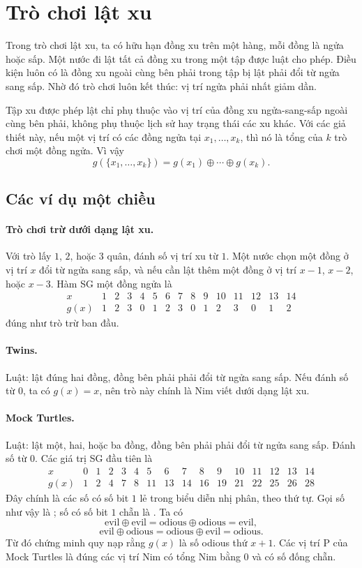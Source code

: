 \documentclass[11pt]{article}
\newcommand{\xor}{\mathbin{\oplus}}
\begin{document}
\section{Trò chơi lật xu}

Trong trò chơi lật xu, ta có hữu hạn đồng xu trên một hàng, mỗi đồng là ngửa
hoặc sấp. Một nước đi lật tất cả đồng xu trong một tập được luật cho phép.
Điều kiện luôn có là đồng xu ngoài cùng bên phải trong tập bị lật phải đổi từ
ngửa sang sấp. Nhờ đó trò chơi luôn kết thúc: vị trí ngửa phải nhất giảm dần.

Tập xu được phép lật chỉ phụ thuộc vào vị trí của đồng xu ngửa-sang-sấp ngoài
cùng bên phải, không phụ thuộc lịch sử hay trạng thái các xu khác. Với các giả
thiết này, nếu một vị trí có các đồng ngửa tại \(x_1,\ldots,x_k\), thì nó là
tổng của \(k\) trò chơi một đồng ngửa. Vì vậy
\[
  g(\{x_1,\ldots,x_k\})=g(x_1)\xor\cdots\xor g(x_k).
\]

\subsection{Các ví dụ một chiều}

\paragraph{Trò chơi trừ dưới dạng lật xu.}
Với trò lấy \(1\), \(2\), hoặc \(3\) quân, đánh số vị trí xu từ \(1\). Một
nước chọn một đồng ở vị trí \(x\) đổi từ ngửa sang sấp, và nếu cần lật thêm
một đồng ở vị trí \(x-1\), \(x-2\), hoặc \(x-3\). Hàm SG một đồng ngửa là
\[
\begin{array}{c|cccccccccccccc}
x&1&2&3&4&5&6&7&8&9&10&11&12&13&14\\ \hline
g(x)&1&2&3&0&1&2&3&0&1&2&3&0&1&2
\end{array}
\]
đúng như trò trừ ban đầu.

\paragraph{Twins.}
Luật: lật đúng hai đồng, đồng bên phải phải đổi từ ngửa sang sấp. Nếu đánh số
từ \(0\), ta có \(g(x)=x\), nên trò này chính là Nim viết dưới dạng lật xu.

\paragraph{Mock Turtles.}
Luật: lật một, hai, hoặc ba đồng, đồng bên phải phải đổi từ ngửa sang sấp.
Đánh số từ \(0\). Các giá trị SG đầu tiên là
\[
\begin{array}{c|ccccccccccccccc}
x&0&1&2&3&4&5&6&7&8&9&10&11&12&13&14\\ \hline
g(x)&1&2&4&7&8&11&13&14&16&19&21&22&25&26&28
\end{array}
\]
Đây chính là các số có số bit \(1\) lẻ trong biểu diễn nhị phân, theo thứ tự.
Gọi số như vậy là ; số có số bit \(1\) chẵn là . Ta có
\[
  \text{evil}\xor\text{evil}=\text{odious}\xor\text{odious}=\text{evil},
\]
\[
  \text{evil}\xor\text{odious}=\text{odious}\xor\text{evil}=\text{odious}.
\]
Từ đó chứng minh quy nạp rằng \(g(x)\) là số odious thứ \(x+1\). Các vị trí P
của Mock Turtles là đúng các vị trí Nim có tổng Nim bằng \(0\) và có số đống
chẵn.
\end{document}
